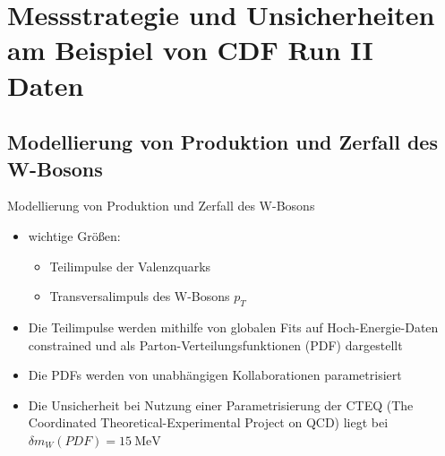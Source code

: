 \documentclass[aspectratio=1610, 9pt]{beamer}
\begin{document}
\section{Messstrategie und Unsicherheiten am Beispiel von CDF Run II Daten}

\subsection{Modellierung von Produktion und Zerfall des W-Bosons}

\begin{frame}{Modellierung von Produktion und Zerfall des W-Bosons}
  \begin{itemize}
    \item wichtige Größen:
    \begin{itemize}
      \item[\rightarrow] Teilimpulse der Valenzquarks
      \item[\rightarrow] Transversalimpuls des W-Bosons $p_T$
    \end{itemize}
    \item Die Teilimpulse werden mithilfe von globalen Fits auf Hoch-Energie-Daten constrained und als Parton-Verteilungsfunktionen (PDF) dargestellt
    \item Die PDFs werden von unabhängigen Kollaborationen parametrisiert
    \item Die Unsicherheit bei Nutzung einer Parametrisierung der CTEQ (The Coordinated Theoretical-Experimental Project on QCD) liegt bei $\delta m_W(PDF) = \SI{15}{\MeV}$
  \end{itemize}




\end{frame}
\end{document}
